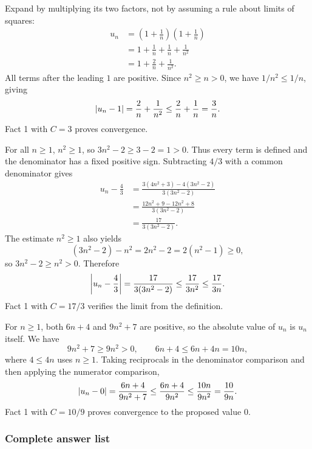 
Expand by multiplying its two factors, not by assuming a rule
about limits of squares:
\begin{align*}
 u_n
 &=\left(1+\frac1n\right)\left(1+\frac1n\right)\\
 &=1+\frac1n+\frac1n+\frac1{n^2}\\
 &=1+\frac2n+\frac1{n^2}.
\end{align*}
All terms after the leading $1$ are positive. Since
$n^2\geq n>0$, we have $1/n^2\leq1/n$, giving
\[
 \left|u_n-1\right|
 =\frac2n+\frac1{n^2}
 \leq\frac2n+\frac1n
 =\frac3n.
\]
Fact 1 with $C=3$ proves convergence.


For all $n\geq1$, $n^2\geq1$, so
$3n^2-2\geq3-2=1>0$. Thus every term is defined and
the denominator has a fixed positive sign.
Subtracting $4/3$ with a common denominator gives
\begin{align*}
 u_n-\frac43
 &=\frac{3(4n^2+3)-4(3n^2-2)}{3(3n^2-2)}\\
 &=\frac{12n^2+9-12n^2+8}{3(3n^2-2)}\\
 &=\frac{17}{3(3n^2-2)}.
\end{align*}
The estimate $n^2\geq1$ also yields
\[
 (3n^2-2)-n^2=2n^2-2=2(n^2-1)\geq0,
\]
so $3n^2-2\geq n^2>0$. Therefore
\[
 \left|u_n-\frac43\right|
 =\frac{17}{3(3n^2-2)}
 \leq\frac{17}{3n^2}
 \leq\frac{17}{3n}.
\]
Fact 1 with $C=17/3$ verifies the limit from the definition.


For $n\geq1$, both $6n+4$ and $9n^2+7$ are positive,
so the absolute value of $u_n$ is $u_n$ itself.
We have
\[
 9n^2+7\geq9n^2>0,
 \qquad 6n+4\leq6n+4n=10n,
\]
where $4\leq4n$ uses $n\geq1$. Taking reciprocals in the
denominator comparison and then applying the numerator comparison,
\[
 \left|u_n-0\right|
 =\frac{6n+4}{9n^2+7}
 \leq\frac{6n+4}{9n^2}
 \leq\frac{10n}{9n^2}
 =\frac{10}{9n}.
\]
Fact 1 with $C=10/9$ proves convergence to the proposed value $0$.


\subsubsection*{Complete answer list}

